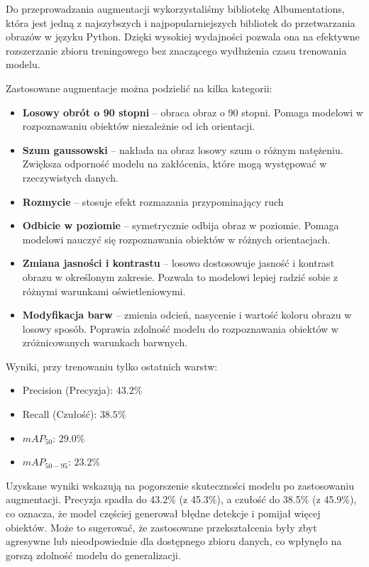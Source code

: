 \documentclass[licencjacka]{pracamgr}
\begin{document}
Do przeprowadzania augmentacji wykorzystaliśmy bibliotekę Albumentations, która jest jedną z najszybszych i najpopularniejszych bibliotek do przetwarzania obrazów w języku Python. Dzięki wysokiej wydajności pozwala ona na efektywne rozszerzanie zbioru treningowego bez znaczącego wydłużenia czasu trenowania modelu.  

Zastosowane augmentacje można podzielić na kilka kategorii:  

\begin{itemize}
    \item \textbf{Losowy obrót o 90 stopni} – obraca obraz o 90 stopni. Pomaga modelowi w rozpoznawaniu obiektów niezależnie od ich orientacji.
    \item \textbf{Szum gaussowski} – nakłada na obraz losowy szum o różnym natężeniu. Zwiększa odporność modelu na zakłócenia, które mogą występować w rzeczywistych danych.
    \item \textbf{Rozmycie} – stosuje efekt rozmazania przypominający ruch
    \item \textbf{Odbicie w poziomie} – symetrycznie odbija obraz w poziomie. Pomaga modelowi nauczyć się rozpoznawania obiektów w różnych orientacjach.
    \item \textbf{Zmiana jasności i kontrastu} – losowo dostosowuje jasność i kontrast obrazu w określonym zakresie. Pozwala to modelowi lepiej radzić sobie z różnymi warunkami oświetleniowymi.
    \item \textbf{Modyfikacja barw} – zmienia odcień, nasycenie i wartość koloru obrazu w losowy sposób. Poprawia zdolność modelu do rozpoznawania obiektów w zróżnicowanych warunkach barwnych.
\end{itemize}

Wyniki, przy trenowaniu tylko ostatnich warstw:

\begin{itemize}
    \item Precision (Precyzja): $43.2\%$
    \item Recall (Czułość): $38.5\%$
    \item $mAP_{50}$: $29.0\%$
    \item $mAP_{50-95}$: $23.2\%$
\end{itemize}

Uzyskane wyniki wskazują na pogorszenie skuteczności modelu po zastosowaniu augmentacji. Precyzja spadła do 43.2\% (z 45.3\%), a czułość do 38.5\% (z 45.9\%), co oznacza, że model częściej generował błędne detekcje i pomijał więcej obiektów. Może to sugerować, że zastosowane przekształcenia były zbyt agresywne lub nieodpowiednie dla dostępnego zbioru danych, co wpłynęło na gorszą zdolność modelu do generalizacji.
\end{document}
